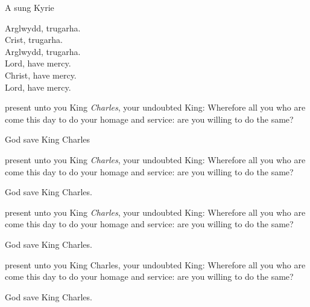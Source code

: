 {
{A sung Kyrie}

\begin{center}

Arglwydd, trugarha.\\
Crist, trugarha.\\
Arglwydd, trugarha.\\
Lord, have mercy.\\
Christ, have mercy.\\
Lord, have mercy.\\
\end{center}


\vfill
\clearpage



 present unto you
King \textit{Charles}, your undoubted King:
Wherefore all you who are come this day
to do your homage and service:
are you willing to do the same?
\vfill 

God save King Charles
\vfill 






 present unto you
King \textit{Charles}, your undoubted King:
Wherefore all you who are come this day
to do your homage and service:
are you willing to do the same?


God save King Charles.
\vfill


 present unto you
King \textit{Charles}, your undoubted King:
Wherefore all you who are come this day
to do your homage and service:
are you willing to do the same?


God save King Charles.


\vfill 
{}

 present unto you
King Charles, your undoubted King:
Wherefore all you who are come this day
to do your homage and service:
are you willing to do the same?


God save King Charles.


\vfill 




}
